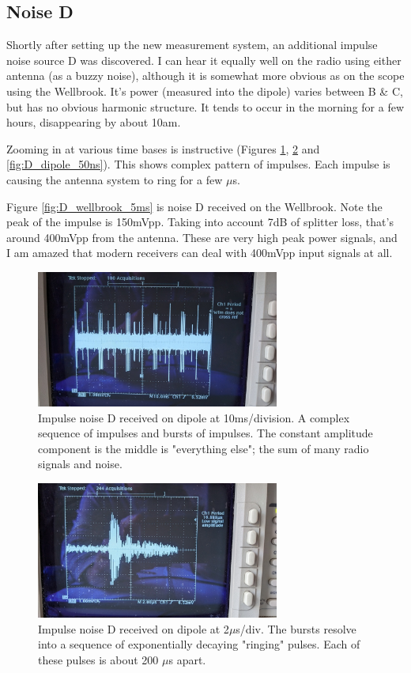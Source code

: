 \documentclass{article}
\begin{document}
\subsection{Noise D}

Shortly after setting up the new measurement system, an additional impulse noise source D was discovered.  I can hear it equally well on the radio using either antenna (as a buzzy noise), although it is somewhat more obvious as on the scope using the Wellbrook.  It's power (measured into the dipole) varies between B \& C, but has no obvious harmonic structure.  It tends to occur in the morning for a few hours, disappearing by about 10am.

Zooming in at various time bases is instructive (Figures \ref{fig:D_dipole_10ms}, \ref{fig:D_dipole_2us} and \ref{fig:D_dipole_50ns}).  This shows complex pattern of impulses.  Each impulse is causing the antenna system to ring for a few $\mu$s.

Figure \ref{fig:D_wellbrook_5ms} is noise D received on the Wellbrook. Note the peak of the impulse is 150mVpp.  Taking into account 7dB of splitter loss, that's around 400mVpp from the antenna.  These are very high peak power signals, and I am amazed that modern receivers can deal with 400mVpp input signals at all.

\begin{figure}[h]
\caption{Impulse noise D received on dipole at 10ms/division.  A complex sequence of impulses and bursts of impulses.  The constant amplitude component is the middle is "everything else"; the sum of many radio signals and noise.}
\label{fig:D_dipole_10ms}
\begin{center}
\includegraphics[width=8cm]{D_dipole_10ms.jpg}
\end{center}
\end{figure}

\begin{figure}[h]
\caption{Impulse noise D received on dipole at 2$\mu$s/div.  The bursts resolve into a sequence of exponentially decaying "ringing" pulses.  Each of these pulses is about 200 $\mu$s apart.}
\label{fig:D_dipole_2us}
\begin{center}
\includegraphics[width=8cm]{D_dipole_2us.jpg}
\end{center}
\end{figure}
\end{document}
